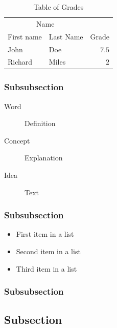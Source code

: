 \documentclass[fleqn,10pt]{SelfArx}\usepackage[]{graphicx}\usepackage[]{color}
\begin{document}
\lipsum[1] %

\begin{table}[hbt]
\caption{Table of Grades}
\centering
\begin{tabular}{llr}
\toprule
\multicolumn{2}{c}{Name} \\
\cmidrule(r){1-2}
First name & Last Name & Grade \\
\midrule
John & Doe & $7.5$ \\
Richard & Miles & $2$ \\
\bottomrule
\end{tabular}
\label{tab:label}
\end{table}

\subsubsection{Subsubsection}

\lipsum[1] %

\begin{description}
\item[Word] Definition
\item[Concept] Explanation
\item[Idea] Text
\end{description}

\subsubsection{Subsubsection}

\lipsum[1] %

\begin{itemize}[noitemsep] %
\item First item in a list
\item Second item in a list
\item Third item in a list
\end{itemize}

\subsubsection{Subsubsection}

\lipsum[1] %

\subsection{Subsection}
\end{document}
